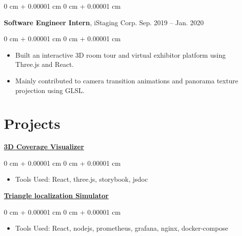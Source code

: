 \documentclass[10pt, letterpaper]{article}
\newenvironment{highlights}{
    \begin{itemize}[
        topsep=0.10 cm,
        parsep=0.10 cm,
        partopsep=0pt,
        itemsep=0pt,
        leftmargin=0 cm + 10pt
    ]
}{
    \end{itemize}
} %
\newenvironment{onecolentry}{
    \begin{adjustwidth}{
        0 cm + 0.00001 cm
    }{
        0 cm + 0.00001 cm
    }
}{
    \end{adjustwidth}
} %
\newenvironment{twocolentry}[2][]{
    \onecolentry
    \def\secondColumn{#2}
    \setcolumnwidth{\fill, 4.5 cm}
    \begin{paracol}{2}
}{
    \switchcolumn \raggedleft \secondColumn
    \end{paracol}
    \endonecolentry
} %
\begin{document}
        \vspace{0.2 cm}

        \begin{twocolentry}{
            Sep. 2019 – Jan. 2020
        }
            \textbf{Software Engineer Intern}, iStaging Corp.\end{twocolentry}

        \vspace{0.10 cm}
        \begin{onecolentry}
            \begin{highlights}
                \item Built an interactive 3D room tour and virtual exhibitor platform using Three.js and React.
                \item Mainly contributed to camera transition animations and panorama texture projection using GLSL.
            \end{highlights}
        \end{onecolentry}

    \section{Projects}
        

        \href{https://github.com/tsengyushiang/coverage-visualizer}{\textbf{3D Coverage Visualizer}}

        \vspace{0.10 cm}
        \begin{onecolentry}
            \begin{highlights}
                \item Tools Used: React, three.js, storybook, jsdoc
            \end{highlights}
        \end{onecolentry}

        \vspace{0.2 cm}

        \href{https://github.com/tsengyushiang/triangle-localization-simulator}{\textbf{Triangle localization Simulator}}
        \vspace{0.10 cm}
        \begin{onecolentry}
            \begin{highlights}
                \item Tools Used: React, nodejs, prometheus, grafana, nginx, docker-compose
            \end{highlights}
        \end{onecolentry}
\end{document}
